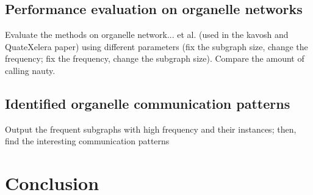 \documentclass[9pt,oneside]{article}
\begin{document}
\subsection{Performance evaluation on organelle networks}
{\color{blue} Evaluate the methods on organelle network... et al.  (used in the kavosh and QuateXelera paper) using different parameters (fix the subgraph size, change the frequency; fix the frequency, change the subgraph size). Compare the amount of calling nauty.}

\subsection{Identified organelle communication patterns}
{\color{blue} Output the frequent subgraphs with high frequency and their instances; then, find the interesting communication patterns}
\section{Conclusion}



\end{document}
